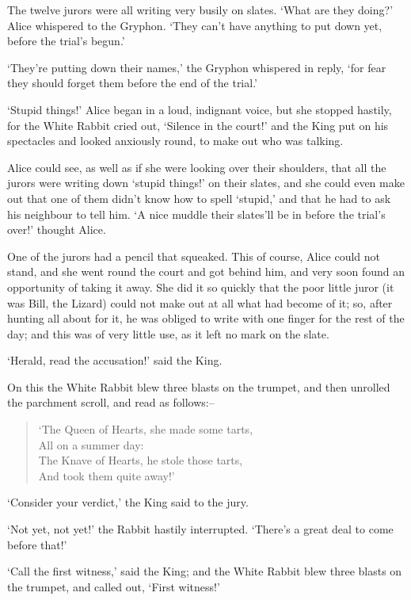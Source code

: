 \documentclass[12pt]{book}
\begin{document}
  The twelve jurors were all writing very busily on slates.
`What are they doing?'  Alice whispered to the Gryphon.  `They
can't have anything to put down yet, before the trial's begun.'

  `They're putting down their names,' the Gryphon whispered in
reply, `for fear they should forget them before the end of the
trial.'

  `Stupid things!' Alice began in a loud, indignant voice, but
she stopped hastily, for the White Rabbit cried out, `Silence in
the court!' and the King put on his spectacles and looked
anxiously round, to make out who was talking.

  Alice could see, as well as if she were looking over their
shoulders, that all the jurors were writing down `stupid things!'
on their slates, and she could even make out that one of them
didn't know how to spell `stupid,' and that he had to ask his
neighbour to tell him.  `A nice muddle their slates'll be in
before the trial's over!' thought Alice.

  One of the jurors had a pencil that squeaked.  This of course,
Alice could not stand, and she went round the court and got
behind him, and very soon found an opportunity of taking it
away.  She did it so quickly that the poor little juror (it was
Bill, the Lizard) could not make out at all what had become of
it; so, after hunting all about for it, he was obliged to write
with one finger for the rest of the day; and this was of very
little use, as it left no mark on the slate.

  `Herald, read the accusation!' said the King.

  On this the White Rabbit blew three blasts on the trumpet, and
then unrolled the parchment scroll, and read as follows:--

\begin{verse}
    `The Queen of Hearts, she made some tarts,\\
          All on a summer day:\\
      The Knave of Hearts, he stole those tarts,\\
          And took them quite away!'
\end{verse}

  `Consider your verdict,' the King said to the jury.

  `Not yet, not yet!' the Rabbit hastily interrupted.  `There's
a great deal to come before that!'

  `Call the first witness,' said the King; and the White Rabbit
blew three blasts on the trumpet, and called out, `First
witness!'
\end{document}
